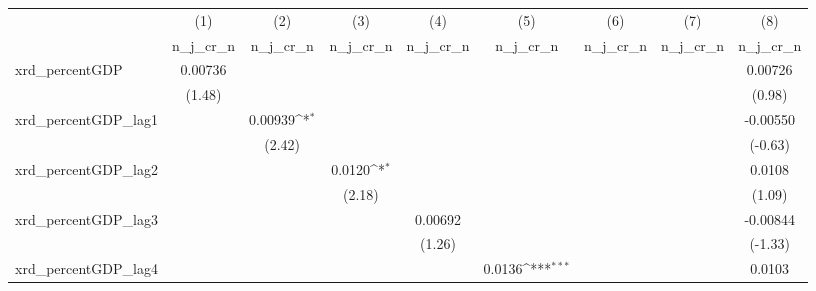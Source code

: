 {
\def\sym#1{\ifmmode^{#1}\else\(^{#1}\)\fi}
\begin{tabular}{l*{8}{c}}
\toprule
          &\multicolumn{1}{c}{(1)}&\multicolumn{1}{c}{(2)}&\multicolumn{1}{c}{(3)}&\multicolumn{1}{c}{(4)}&\multicolumn{1}{c}{(5)}&\multicolumn{1}{c}{(6)}&\multicolumn{1}{c}{(7)}&\multicolumn{1}{c}{(8)}\\
          &\multicolumn{1}{c}{n\_j\_cr\_n}&\multicolumn{1}{c}{n\_j\_cr\_n}&\multicolumn{1}{c}{n\_j\_cr\_n}&\multicolumn{1}{c}{n\_j\_cr\_n}&\multicolumn{1}{c}{n\_j\_cr\_n}&\multicolumn{1}{c}{n\_j\_cr\_n}&\multicolumn{1}{c}{n\_j\_cr\_n}&\multicolumn{1}{c}{n\_j\_cr\_n}\\
\midrule
xrd\_percentGDP&  0.00736         &                  &                  &                  &                  &                  &                  &  0.00726         \\
          &   (1.48)         &                  &                  &                  &                  &                  &                  &   (0.98)         \\
\addlinespace
xrd\_percentGDP\_lag1&                  &  0.00939\sym{*}  &                  &                  &                  &                  &                  & -0.00550         \\
          &                  &   (2.42)         &                  &                  &                  &                  &                  &  (-0.63)         \\
\addlinespace
xrd\_percentGDP\_lag2&                  &                  &   0.0120\sym{*}  &                  &                  &                  &                  &   0.0108         \\
          &                  &                  &   (2.18)         &                  &                  &                  &                  &   (1.09)         \\
\addlinespace
xrd\_percentGDP\_lag3&                  &                  &                  &  0.00692         &                  &                  &                  & -0.00844         \\
          &                  &                  &                  &   (1.26)         &                  &                  &                  &  (-1.33)         \\
\addlinespace
xrd\_percentGDP\_lag4&                  &                  &                  &                  &   0.0136\sym{***}&                  &                  &   0.0103         \\

\end{tabular}}
